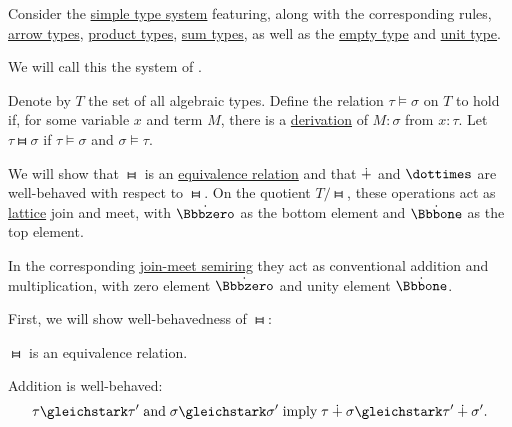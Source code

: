 \begin{definition}\label{def:simple_algebraic_types}\mimprovised
  Consider the \hyperref[def:simple_type_system]{simple type system} featuring, along with the corresponding rules, \hyperref[def:simple_type]{arrow types}, \hyperref[def:product_type]{product types}, \hyperref[def:product_type]{sum types}, as well as the \hyperref[def:empty_type]{empty type} and \hyperref[def:unit_type]{unit type}.

  We will call this the system of .
\end{definition}

\begin{proposition}\label{thm:simple_algebraic_type_arithmetic}
  Denote by \( T \) the set of all algebraic types. Define the relation \( \tau \vDash \sigma \) on \( T \) to hold if, for some variable \( x \) and term \( M \), there is a \hyperref[def:type_derivation_tree]{derivation} of \( M: \sigma \) from \( x: \tau \). Let \( \tau \gleichstark \sigma \) if \( \tau \vDash \sigma \) and \( \sigma \vDash \tau \).

  We will show that \( {\gleichstark} \) is an \hyperref[def:equivalence_relation]{equivalence relation} and that \( {\mathbin{\dotplus}} \) and \( {\syntimes} \) are well-behaved with respect to \( {\gleichstark} \). On the quotient \( T / {\gleichstark} \), these operations act as \hyperref[def:lattice]{lattice} join and meet, with \( {\syn\Bbbzero} \) as the bottom element and \( {\syn\Bbbone} \) as the top element.

  In the corresponding \hyperref[ex:def:semiring/lattice]{join-meet semiring} they act as conventional addition and multiplication, with zero element \( {\syn\Bbbzero} \) and unity element \( {\syn\Bbbone} \).

  First, we will show well-behavedness of \( {\gleichstark} \):
  \begin{thmenum}[series=thm:simple_algebraic_type_arithmetic]
     \( {\gleichstark} \) is an equivalence relation.

     Addition is well-behaved:
    \begin{equation}\label{eq:thm:simple_algebraic_type_arithmetic/addition_well_behaved}
      \tau \gleichstark \tau' \T{and} \sigma \gleichstark \sigma' \T{imply} \tau \synplus \sigma \gleichstark \tau' \synplus \sigma'.
    \end{equation}


\end{thmenum}
\end{proposition}
